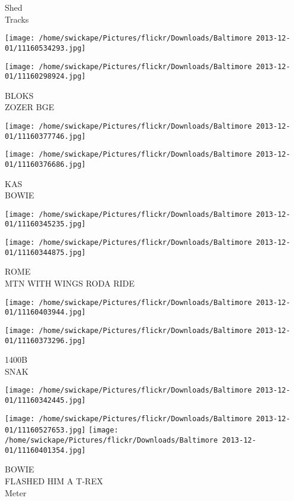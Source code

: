 \documentclass[10pt,letterpaper]{article}
\begin{document}
Shed\\
Tracks
\pagebreak

\texttt{[image: /home/swickape/Pictures/flickr/Downloads/Baltimore 2013-12-01/11160534293.jpg]}

\vspace{0.25in}
\texttt{[image: /home/swickape/Pictures/flickr/Downloads/Baltimore 2013-12-01/11160298924.jpg]}

BLOKS\\
ZOZER BGE
\pagebreak

\texttt{[image: /home/swickape/Pictures/flickr/Downloads/Baltimore 2013-12-01/11160377746.jpg]}

\vspace{0.25in}
\texttt{[image: /home/swickape/Pictures/flickr/Downloads/Baltimore 2013-12-01/11160376686.jpg]}

KAS\\
BOWIE
\pagebreak

\texttt{[image: /home/swickape/Pictures/flickr/Downloads/Baltimore 2013-12-01/11160345235.jpg]}

\vspace{0.25in}
\texttt{[image: /home/swickape/Pictures/flickr/Downloads/Baltimore 2013-12-01/11160344875.jpg]}

ROME\\
MTN WITH WINGS RODA RIDE
\pagebreak

\texttt{[image: /home/swickape/Pictures/flickr/Downloads/Baltimore 2013-12-01/11160403944.jpg]}

\vspace{0.25in}
\texttt{[image: /home/swickape/Pictures/flickr/Downloads/Baltimore 2013-12-01/11160373296.jpg]}

1400B\\
SNAK
\pagebreak

\texttt{[image: /home/swickape/Pictures/flickr/Downloads/Baltimore 2013-12-01/11160342445.jpg]}

\vspace{0.25in}
\texttt{[image: /home/swickape/Pictures/flickr/Downloads/Baltimore 2013-12-01/11160527653.jpg]}
\texttt{[image: /home/swickape/Pictures/flickr/Downloads/Baltimore 2013-12-01/11160401354.jpg]}

BOWIE\\
FLASHED HIM A T{-}REX\\
Meter
\pagebreak
\end{document}
